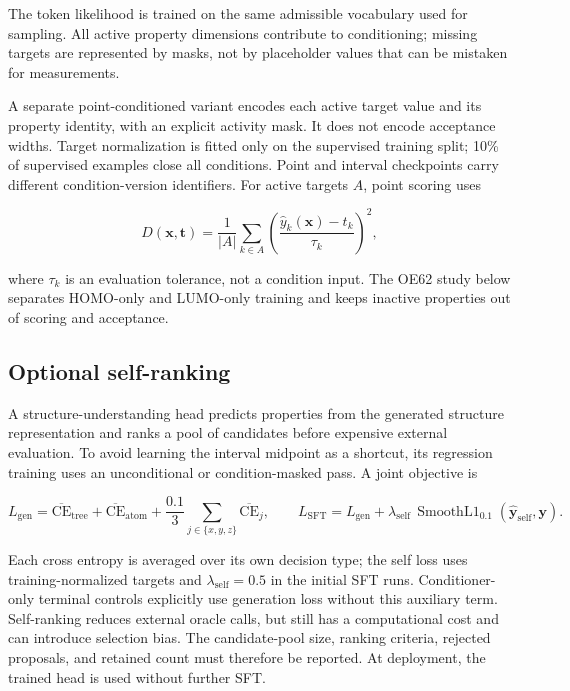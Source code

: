 \documentclass[11pt,a4paper]{article}
\begin{document}
The token likelihood is trained on the same admissible vocabulary used
for sampling. All active property dimensions contribute to conditioning;
missing targets are represented by masks, not by placeholder values that
can be mistaken for measurements.

A separate point-conditioned variant encodes each active target value
and its property identity, with an explicit activity mask. It does not
encode acceptance widths. Target normalization is fitted only on the
supervised training split; 10\% of supervised examples close all
conditions. Point and interval checkpoints carry different
condition-version identifiers. For active targets \(A\), point scoring
uses

\[
D(\mathbf{x},\mathbf{t})=\frac{1}{|A|}\sum_{k\in A}
\left(\frac{\hat y_k(\mathbf{x})-t_k}{\tau_k}\right)^2,
\]

where \(\tau_k\) is an evaluation tolerance, not a condition input. The
OE62 study below separates HOMO-only and LUMO-only training and keeps
inactive properties out of scoring and acceptance.

\FloatBarrier
\subsection{Optional self-ranking}\label{optional-self-ranking}

A structure-understanding head predicts properties from the generated
structure representation and ranks a pool of candidates before expensive
external evaluation. To avoid learning the interval midpoint as a
shortcut, its regression training uses an unconditional or
condition-masked pass. A joint objective is

\[
L_{\mathrm{gen}}=\overline{\mathrm{CE}}_{\mathrm{tree}}
+\overline{\mathrm{CE}}_{\mathrm{atom}}
+\frac{0.1}{3}\sum_{j\in\{x,y,z\}}\overline{\mathrm{CE}}_j,
\qquad
L_{\mathrm{SFT}}=L_{\mathrm{gen}}+
\lambda_{\mathrm{self}}\,\operatorname{SmoothL1}_{0.1}
(\hat{\mathbf y}_{\mathrm{self}},\mathbf y).
\]

Each cross entropy is averaged over its own decision type; the self loss
uses training-normalized targets and \(\lambda_{\mathrm{self}}=0.5\) in
the initial SFT runs. Conditioner-only terminal controls explicitly use
generation loss without this auxiliary term. Self-ranking reduces
external oracle calls, but still has a computational cost and can
introduce selection bias. The candidate-pool size, ranking criteria,
rejected proposals, and retained count must therefore be reported. At
deployment, the trained head is used without further SFT.
\end{document}
